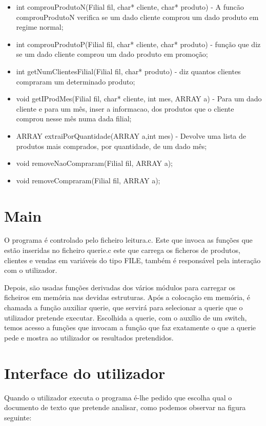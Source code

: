 \begin{itemize}
\item	int comprouProdutoN(Filial fil, char* cliente, char* produto) - A funcão comprouProdutoN verifica se um dado cliente comprou um dado produto em regime normal; 

\item	int comprouProdutoP(Filial fil, char* cliente, char* produto) - função que diz se um dado cliente comprou um dado produto em promoção; 

\item	int getNumClientesFilial(Filial fil, char* produto) - diz quantos clientes compraram um determinado produto; 

\item	void getIProdMes(Filial fil, char* cliente, int mes, ARRAY a) - Para um dado cliente e para um mês, inser a informacao, dos produtos que o cliente comprou nesse mês numa dada filial; 
\item	ARRAY extraiPorQuantidade(ARRAY a,int mes) - Devolve uma lista de produtos mais comprados, por quantidade, de um dado mês; 
\item	void removeNaoCompraram(Filial fil, ARRAY a);
\item	void removeCompraram(Filial fil, ARRAY a);
\end{itemize}


\chapter{Main}

O programa é controlado pelo ficheiro leitura.c. Este que invoca as funções que estão inseridas no ficheiro querie.c este que carrega os ficheros de produtos, clientes e vendas em variáveis do tipo FILE,  também é responsável pela interação com o utilizador.


 
Depois, são usadas funções derivadas dos vários módulos para carregar os ficheiros em memória nas devidas estruturas. Após a colocação em memória, é chamada a função auxiliar querie, que servirá para selecionar a querie que o utilizador pretende executar. Escolhida a querie, com o auxílio de um switch, temos acesso a funções que invocam a função que faz exatamente o que a querie pede e mostra ao utilizador os resultados pretendidos.


\chapter{Interface do utilizador}
Quando o utilizador executa o programa é-lhe pedido que escolha qual o documento de texto que pretende analisar, como podemos observar na figura seguinte: 

